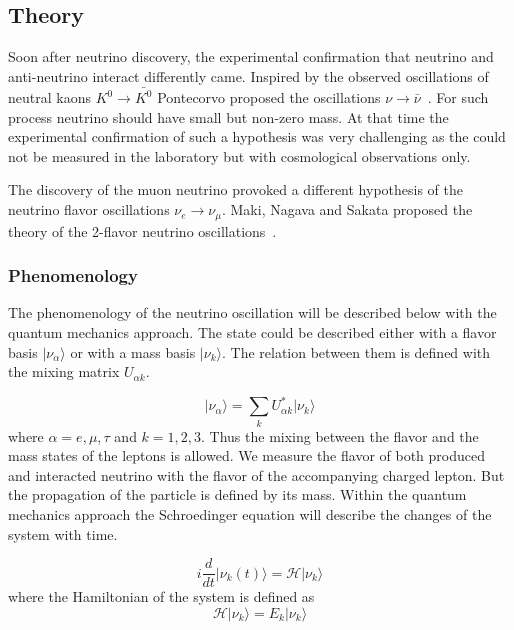 \documentclass[../main.tex]{subfiles}
\begin{document}
\subsection{Theory}
Soon after neutrino discovery, the experimental confirmation that neutrino and anti-neutrino interact differently came. Inspired by the observed oscillations of neutral kaons $K^0\to\bar{K^0}$ Pontecorvo proposed the oscillations $\nu\to\bar\nu$~\cite{Pontecorvo1957}. For such process neutrino should have small but non-zero mass. At that time the experimental confirmation of such a hypothesis was very challenging as the could not be measured in the laboratory but with cosmological observations only.

The discovery of the muon neutrino provoked a different hypothesis of the neutrino flavor oscillations $\nu_e\to\nu_\mu$. Maki, Nagava and Sakata proposed the theory of the 2-flavor neutrino oscillations~\cite{Maki1962}.

\subsubsection{Phenomenology}
The phenomenology of the neutrino oscillation will be described below with the quantum mechanics approach. The state could be described either with a flavor basis $\lvert\nu_\alpha\rangle$ or with a mass basis $\lvert\nu_k\rangle$. The relation between them is defined with the mixing matrix $U_{\alpha k}$.

\begin{equation}
\label{eq:intro:mixing}
\lvert\nu_\alpha\rangle = \sum_kU^*_{\alpha k}\lvert\nu_k\rangle
\end{equation}
where $\alpha = e, \mu, \tau$ and $k=1, 2, 3$. Thus the mixing between the flavor and the mass states of the leptons is allowed. We measure the flavor of both produced and interacted neutrino with the flavor of the accompanying charged lepton. But the propagation of the particle is defined by its mass. Within the quantum mechanics approach the Schroedinger equation will describe the changes of the system with time.

\begin{equation}
i\frac{d}{dt}\lvert\nu_k(t)\rangle=\mathcal{H}\lvert\nu_k\rangle
\end{equation}
where the Hamiltonian of the system is defined as
\begin{equation}
\mathcal{H}\lvert\nu_k\rangle=E_k\lvert\nu_k\rangle
\end{equation}
\end{document}
